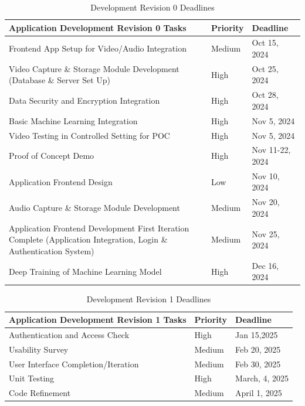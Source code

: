 \documentclass[12pt]{article}
\begin{document}
\begin{table}[H]
  \caption{Development Revision 0 Deadlines}
  \begin{tabularx}{\textwidth}{|p{8cm}|p{2cm}|X|}
  \hline
  \textbf{Application Development Revision 0 Tasks} & \textbf{Priority} &  \textbf{Deadline} \\
  \hline
  Frontend App Setup for Video/Audio Integration & Medium &  Oct 15, 2024 \\
  \hline
  Video Capture \& Storage Module Development (Database \& Server Set Up) & High &  Oct 25, 2024 \\
  \hline
  Data Security and Encryption Integration & High & Oct 28, 2024 \\
  \hline
  Basic Machine Learning Integration & High & Nov 5, 2024 \\
  \hline
  Video Testing in Controlled Setting for POC & High & Nov 5, 2024 \\
  \hline
  Proof of Concept Demo & High &  Nov 11-22, 2024 \\
  \hline
  Application Frontend Design & Low & Nov 10, 2024 \\
  \hline
  Audio Capture \& Storage Module Development & Medium & Nov 20, 2024 \\
  \hline
  Application Frontend Development First Iteration Complete (Application Integration, Login \& Authentication System) & Medium & Nov 25, 2024 \\
  \hline
  Deep Training of Machine Learning Model & High & Dec 16, 2024 \\
  \hline
  \end{tabularx}
\end{table}

\begin{table}[H]
  \caption{Development Revision 1 Deadlines}
  \begin{tabularx}{\textwidth}{|p{8cm}|p{2cm}|X|}
  \hline
  \textbf{Application Development Revision 1 Tasks} & \textbf{Priority} & \textbf{Deadline} \\
  \hline
  Authentication and Access Check & High & Jan 15,2025 \\
  \hline 
  Usability Survey & Medium & Feb 20, 2025 \\
  \hline 
  User Interface Completion/Iteration & Medium & Feb 30, 2025 \\
  \hline 
  Unit Testing & High & March, 4, 2025 \\
  \hline 
  Code Refinement & Medium & April 1, 2025 \\
  \hline
  \end{tabularx}
\end{table}
\end{document}

